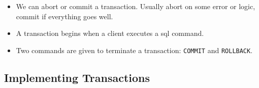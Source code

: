 \documentclass[12pt]{article}
\begin{document}
\begin{itemize}
	\item We can abort or commit a transaction. Usually abort on some error or
		logic, commit if everything goes well.
	\item A transaction begins when a client executes a sql command.
	\item Two commands are given to terminate a transaction: \texttt{COMMIT} and
		\texttt{ROLLBACK}.
\end{itemize}



\subsection{Implementing Transactions}
\end{document}
